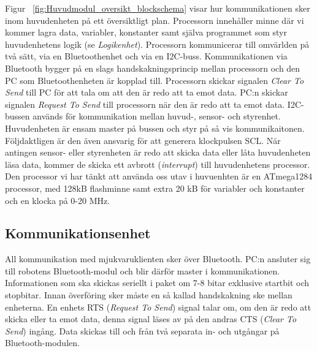 \documentclass{article}
\begin{document}
Figur ~\ref{fig:Huvudmodul_oversikt_blockschema} visar hur kommunikationen sker inom huvudenheten på ett översiktligt plan. Processorn innehåller minne där vi kommer lagra data, variabler, konstanter samt själva programmet som styr huvudenhetens logik (se \textit{Logikenhet}). Processorn kommunicerar till omvärlden på två sätt, via en Bluetoothenhet och via en I2C-buss. Kommunikationen via Bluetooth bygger på en slags handskakningsprincip mellan processorn och den PC som Bluetoothenheten är kopplad till. Processorn skickar signalen \textit{Clear To Send} till PC för att tala om att den är redo att ta emot data. PC:n skickar signalen \textit{Request To Send} till processorn när den är redo att ta emot data. I2C-bussen används för kommunikation mellan huvud-, sensor- och styrenhet. Huvudenheten är ensam master på bussen och styr på så vis kommunikaitonen. Följdaktligen är den även ansvarig för att generera klockpulsen SCL. När antingen sensor- eller styrenheten är redo att skicka data eller låta huvudenheten läsa data, kommer de skicka ett avbrott (\textit{interrupt}) till huvudenhetens processor. Den processor vi har tänkt att använda oss utav i huvuenhten är en ATmega1284 processor, med 128kB flashminne samt extra 20 kB för variabler och konstanter och en klocka på 0-20 MHz.
 
\subsection{Kommunikationsenhet}
All kommunikation med mjukvaruklienten sker över Bluetooth. PC:n ansluter sig till robotens Bluetooth-modul och blir därför master i kommunikationen. Informationen som ska skickas seriellt i paket om 7-8 bitar exklusive startbit och stopbitar. Innan överföring sker måste en så kallad handskakning ske mellan enheterna. En enhets RTS (\textit{Request To Send}) signal talar om, om den är redo att skicka eller ta emot data, denna signal läses av på den andras CTS (\textit{Clear To Send}) ingång. Data skickas till och från två separata in- och utgångar på Bluetooth-modulen. 
\newline\newline
\end{document}
